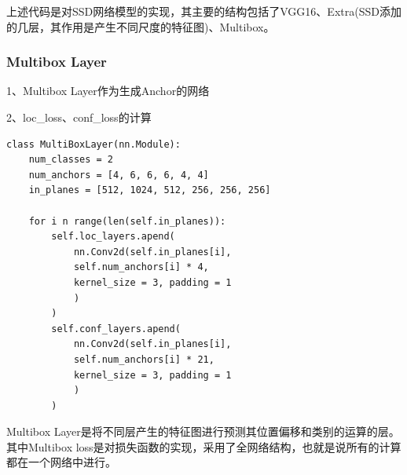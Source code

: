 上述代码是对SSD网络模型的实现，其主要的结构包括了VGG16、Extra(SSD添加的几层，其作用是产生不同尺度的特征图)、Multibox。
\subsubsection{Multibox Layer}
1、Multibox Layer作为生成Anchor的网络

2、loc\_loss、conf\_loss的计算

\begin{lstlisting}[caption={Multibox layer}]
class MultiBoxLayer(nn.Module):
	num_classes = 2
	num_anchors = [4, 6, 6, 6, 4, 4]
	in_planes = [512, 1024, 512, 256, 256, 256]
	
	for i n range(len(self.in_planes)):
		self.loc_layers.apend(
			nn.Conv2d(self.in_planes[i],
			self.num_anchors[i] * 4,
			kernel_size = 3, padding = 1
			)
		)
		self.conf_layers.apend(
			nn.Conv2d(self.in_planes[i],
			self.num_anchors[i] * 21,
			kernel_size = 3, padding = 1
			)
		)
\end{lstlisting}

Multibox Layer是将不同层产生的特征图进行预测其位置偏移和类别的运算的层。其中Multibox loss是对损失函数的实现，采用了全网络结构，也就是说所有的计算都在一个网络中进行。
